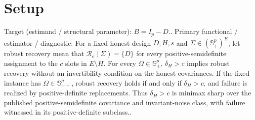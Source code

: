 \documentclass{article}
\begin{document}
\section{Setup}

Target (estimand / structural parameter): \(B=I_p-D\)..
Primary functional / estimator / diagnostic: For a fixed honest design \(D,H,s\) and \(\Sigma\in(\mathbb S_+^p)^E\), let robust recovery mean that \(\mathcal R_c(\Sigma)=\{D\}\) for every positive-semidefinite assignment to the \(c\) slots in \(E\setminus H\). For every \(\Omega\in\mathbb S_+^p\), \(\delta_H>c\) implies robust recovery without an invertibility condition on the honest covariances. If the fixed instance has \(\Omega\in\mathbb S_{++}^p\), robust recovery holds if and only if \(\delta_H>c\), and failure is realized by positive-definite replacements. Thus \(\delta_H>c\) is minimax sharp over the published positive-semidefinite covariance and invariant-noise class, with failure witnessed in its positive-definite subclass..
\end{document}
